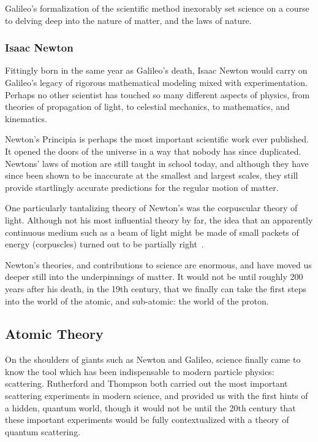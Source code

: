 Galileo's formalization of the scientific method inexorably set science on a
course to delving deep into the nature of matter, and the laws of nature.

\subsubsection{Isaac Newton}
Fittingly born in the same year as Galileo's death, Isaac Newton would carry on
Galileo's legacy of rigorous mathematical modeling mixed with experimentation.
Perhaps no other scientist has touched so many different aspects of physics,
from theories of propagation of light, to celestial mechanics, to mathematics,
and kinematics.

Newton's Principia is perhaps the most important scientific work ever published.
It opened the doors of the universe in a way that nobody has since duplicated.
Newtons' laws of motion are still taught in school today, and although they have
since been shown to be inaccurate at the smallest and largest scales, they still
provide startlingly accurate predictions for the regular motion of matter.

One particularly tantalizing theory of Newton's was the corpuscular theory of
light. Although not his most influential theory by far, the idea that an
apparently continuous medium such as a beam of light might be made of small
packets of energy (corpuscles) turned out to be partially
right~\cite{Stuewer1970}.

Newton's theories, and contributions to science are enormous, and have moved us
deeper still into the underpinnings of matter. It would not be until roughly 200
years after his death, in the 19th century, that we finally can take the first
steps into the world of the atomic, and sub-atomic: the world of the proton. 

\clearpage
\subsection{Atomic Theory}

On the shoulders of giants such as Newton and Galileo, science finally came to
know the tool which has been indispensable to modern particle physics:
scattering. Rutherford and Thompson both carried out the most important
scattering experiments in modern science, and provided us with the first hints
of a hidden, quantum world, though it would not be until the 20th century that
these important experiments would be fully contextualized with a theory of
quantum scattering.

